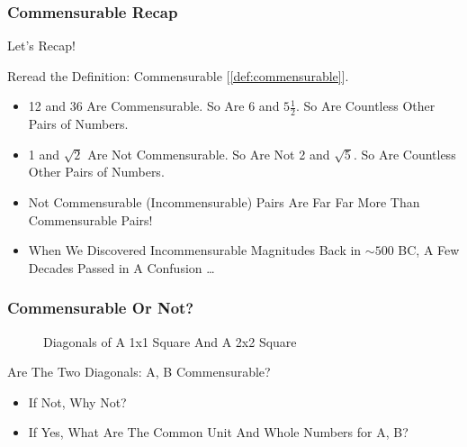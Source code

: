 \documentclass{beamer}
\begin{document}
\begin{frame}
\frametitle{Commensurable Recap}
\label{slide:commensurablerecap}

Let's Recap!

\pause
Reread the Definition: Commensurable [\ref{def:commensurable}].

\begin{itemize}
\item 12 and 36 Are Commensurable. So Are 6 and $5\frac{1}{2}$. So Are Countless Other Pairs of Numbers.
\pause
\item 1 and $\sqrt{2}$ Are \alert{Not} Commensurable. So Are \alert{Not} 2 and $\sqrt{5}$. So Are Countless Other Pairs of Numbers.
\pause
\item Not Commensurable (Incommensurable) Pairs Are \alert{Far Far More} Than Commensurable Pairs!
\pause
\item {\Large When We Discovered Incommensurable Magnitudes Back in $\sim500$ BC, A Few Decades Passed in A Confusion \dots}
\end{itemize}
\end{frame}

\begin{frame}
\frametitle{Commensurable Or Not?}
\begin{figure}[H]
\caption{Diagonals of A 1x1 Square And A 2x2 Square}
\label{fig:1x12x2s}
\end{figure}
\pause
Are The Two \alert{Diagonals: A, B} Commensurable?
\pause
\begin{itemize}
\item If Not, Why Not?
\pause
\item If Yes, What Are The Common Unit And Whole Numbers for A, B?
\end{itemize}

\end{frame}
\end{document}
